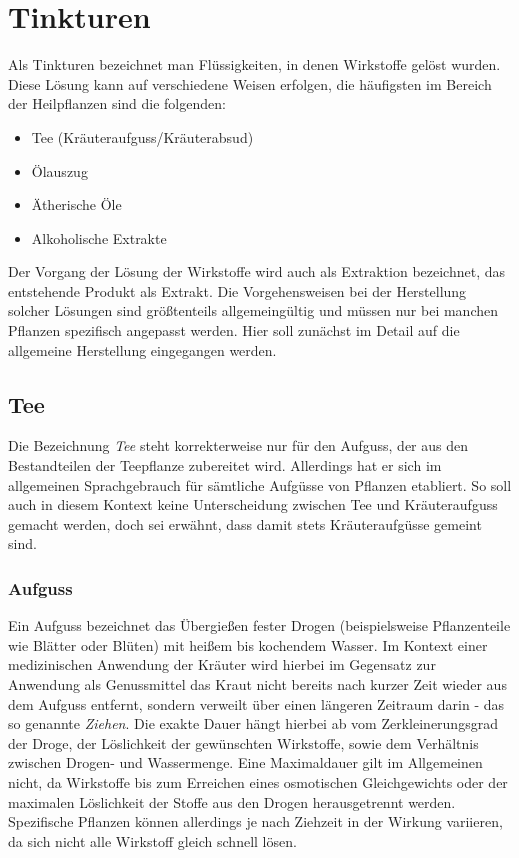 \chapter{Tinkturen}

Als Tinkturen bezeichnet man Flüssigkeiten, in denen Wirkstoffe gelöst wurden. Diese Lösung kann auf verschiedene Weisen erfolgen, die häufigsten im Bereich der Heilpflanzen sind die folgenden:
\begin{itemize}
\item Tee (Kräuteraufguss/Kräuterabsud)
\item Ölauszug
\item Ätherische Öle
\item Alkoholische Extrakte
\end{itemize}

Der Vorgang der Lösung der Wirkstoffe wird auch als Extraktion bezeichnet, das entstehende Produkt als Extrakt. Die Vorgehensweisen bei der Herstellung solcher Lösungen sind größtenteils allgemeingültig und müssen nur bei manchen Pflanzen spezifisch angepasst werden. Hier soll zunächst im Detail auf die allgemeine Herstellung eingegangen werden.

\section{Tee}
Die Bezeichnung \textit{Tee} steht korrekterweise nur für den Aufguss, der aus den Bestandteilen der Teepflanze zubereitet wird. Allerdings hat er sich im allgemeinen Sprachgebrauch für sämtliche Aufgüsse von Pflanzen etabliert. So soll auch in diesem Kontext keine Unterscheidung zwischen Tee und Kräuteraufguss gemacht werden, doch sei erwähnt, dass damit stets Kräuteraufgüsse gemeint sind.

\subsection{Aufguss}
Ein Aufguss bezeichnet das Übergießen fester Drogen (beispielsweise Pflanzenteile wie Blätter oder Blüten) mit heißem bis kochendem Wasser. Im Kontext einer medizinischen Anwendung der Kräuter wird hierbei im Gegensatz zur Anwendung als Genussmittel das Kraut nicht bereits nach kurzer Zeit wieder aus dem Aufguss entfernt, sondern verweilt über einen längeren Zeitraum darin - das so genannte \textit{Ziehen}. Die exakte Dauer hängt hierbei ab vom Zerkleinerungsgrad der Droge, der Löslichkeit der gewünschten Wirkstoffe, sowie dem Verhältnis zwischen Drogen- und Wassermenge. Eine Maximaldauer gilt im Allgemeinen nicht, da Wirkstoffe bis zum Erreichen eines osmotischen Gleichgewichts oder der maximalen Löslichkeit der Stoffe aus den Drogen herausgetrennt werden. Spezifische Pflanzen können allerdings je nach Ziehzeit in der Wirkung variieren, da sich nicht alle Wirkstoff gleich schnell lösen.
